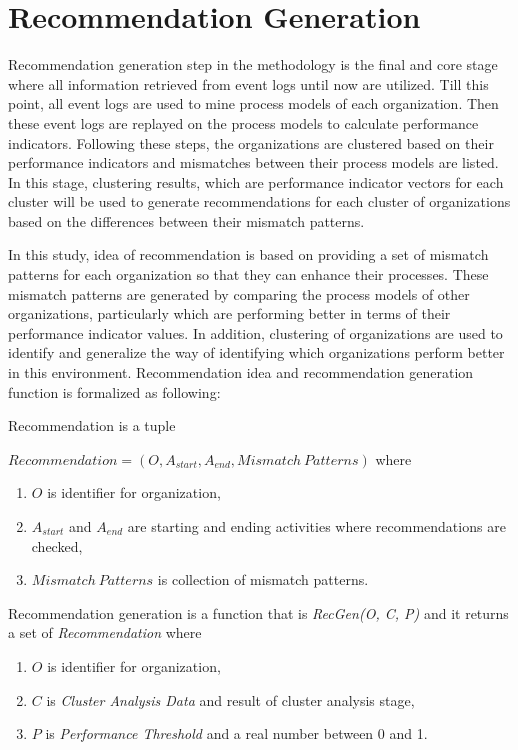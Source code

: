 \section{Recommendation Generation}
\label{sec:recommendation-generation}
Recommendation generation step in the methodology is the final and core stage where all information retrieved from event logs until now are utilized. Till this point, all event logs are used to mine process models of each organization. Then these event logs are replayed on the process models to calculate performance indicators. Following these steps, the organizations are clustered based on their performance indicators and mismatches between their process models are listed. In this stage, clustering results, which are performance indicator vectors for each cluster will be used to generate recommendations for each cluster of organizations based on the differences between their mismatch patterns.

In this study, idea of recommendation is based on providing a set of mismatch patterns for each organization so that they can enhance their processes. These mismatch patterns are generated by comparing the process models of other organizations, particularly which are performing better in terms of their performance indicator values. In addition, clustering of organizations are used to identify and generalize the way of identifying which organizations perform better in this environment. Recommendation idea and recommendation generation function is formalized as following:
\theoremstyle{definition}
\begin{definition}
Recommendation is a tuple 

${Recommendation} = (O, A_{start}, A_{end}, Mismatch\ Patterns) $ where 
	\begin{enumerate}
	  \item $O$ is identifier for organization,
	  \item $A_{start}$ and $A_{end}$ are starting and ending activities where recommendations are checked,
	  \item $Mismatch\ Patterns$ is collection of mismatch patterns.
	\end{enumerate}
\end{definition}

\theoremstyle{definition}
\begin{definition}
Recommendation generation is a function that is \textit{RecGen(O, C, P)} and it returns a set of \textit{Recommendation} where
	\begin{enumerate}
	  \item $O$ is identifier for organization,
	  \item $C$ is \textit{Cluster Analysis Data} and result of cluster analysis stage,
	  \item $P$ is \textit{Performance Threshold} and a real number between 0 and 1.
	\end{enumerate}
\end{definition}

